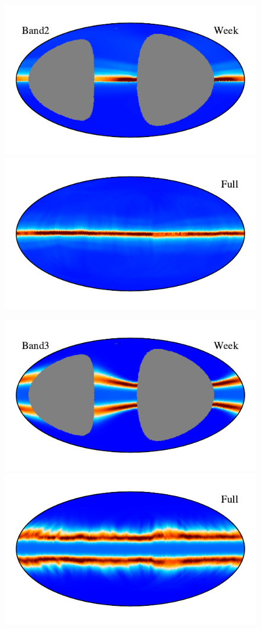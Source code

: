 \documentclass{aa}
\begin{document}
\begin{figure}
    \vspace{-0.6cm}

    \includegraphics[width=0.88\columnwidth]{figs/zodi_comps/zodi_06_band2_week.pdf}\includegraphics[width=0.88\columnwidth]{figs/zodi_comps/zodi_06_band2_full.pdf}

    \vspace{-0.6cm}

    \includegraphics[width=0.88\columnwidth]{figs/zodi_comps/zodi_06_band3_week.pdf}\includegraphics[width=0.88\columnwidth]{figs/zodi_comps/zodi_06_band3_full.pdf}


\end{figure}
\end{document}
